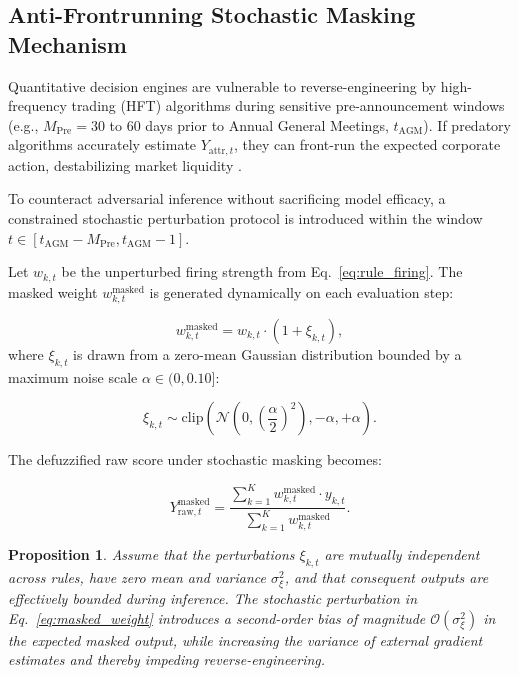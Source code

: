 \documentclass[pdflatex,sn-mathphys-num]{sn-jnl}
\theoremstyle{thmstyleone}
\newtheorem{proposition}[theorem]{Proposition}
\theoremstyle{thmstyletwo}
\theoremstyle{thmstylethree}
\begin{document}
\subsection{Anti-Frontrunning Stochastic Masking Mechanism}\label{subsec3_4}

Quantitative decision engines are vulnerable to reverse-engineering by high-frequency trading (HFT) algorithms during sensitive pre-announcement windows (e.g., $M_{\mathrm{Pre}} = 30$ to $60$ days prior to Annual General Meetings, $t_{\mathrm{AGM}}$). If predatory algorithms accurately estimate $Y_{\mathrm{attr},t}$, they can front-run the expected corporate action, destabilizing market liquidity \cite{easley2012,cartea2015}.

To counteract adversarial inference without sacrificing model efficacy, a constrained stochastic perturbation protocol is introduced within the window $t \in [t_{\mathrm{AGM}} - M_{\mathrm{Pre}}, t_{\mathrm{AGM}} - 1]$.

Let $w_{k,t}$ be the unperturbed firing strength from Eq.~\eqref{eq:rule_firing}. The masked weight $w_{k,t}^{\text{masked}}$ is generated dynamically on each evaluation step:

\begin{equation}
    w_{k,t}^{\text{masked}} = w_{k,t} \cdot \left( 1 + \xi_{k,t} \right),
    \label{eq:masked_weight}
\end{equation}
where $\xi_{k,t}$ is drawn from a zero-mean Gaussian distribution bounded by a maximum noise scale $\alpha \in (0, 0.10]$:

\begin{equation}
    \xi_{k,t} \sim \mathrm{clip}\left( \mathcal{N}\left(0, \left(\frac{\alpha}{2}\right)^2\right), -\alpha, +\alpha \right).
    \label{eq:noise_dist}
\end{equation}

The defuzzified raw score under stochastic masking becomes:

\begin{equation}
    Y_{\mathrm{raw},t}^{\text{masked}} = \frac{\sum_{k=1}^{K} w_{k,t}^{\text{masked}} \cdot y_{k,t}}{\sum_{k=1}^{K} w_{k,t}^{\text{masked}}}.
    \label{eq:masked_defuzz}
\end{equation}

\begin{proposition}
Assume that the perturbations $\xi_{k,t}$ are mutually independent across rules, have zero mean and variance $\sigma_{\xi}^2$, and that consequent outputs are effectively bounded during inference. The stochastic perturbation in Eq.~\eqref{eq:masked_weight} introduces a second-order bias of magnitude $\mathcal{O}(\sigma_{\xi}^2)$ in the expected masked output, while increasing the variance of external gradient estimates and thereby impeding reverse-engineering.
\end{proposition}
\end{document}
